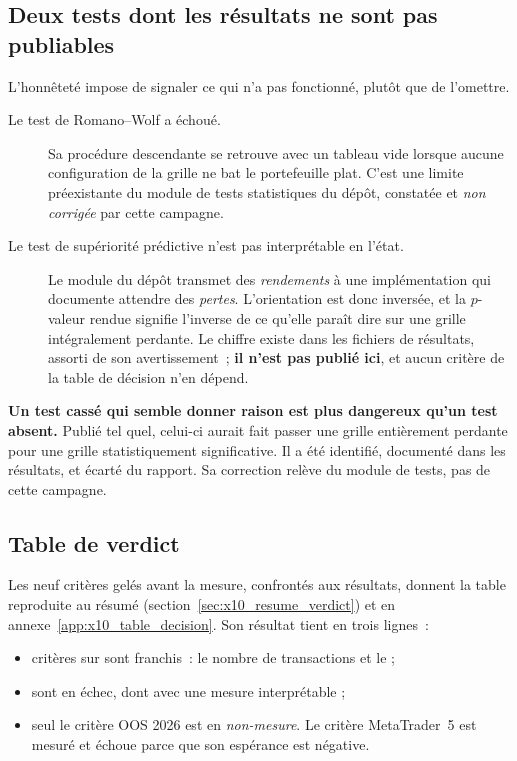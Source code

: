 \subsection{Deux tests dont les résultats ne sont pas publiables}

L'honnêteté impose de signaler ce qui n'a pas fonctionné, plutôt que de
l'omettre.

\begin{description}
  \item[Le test de Romano--Wolf a échoué.] Sa procédure descendante se
  retrouve avec un tableau vide lorsque aucune configuration de la grille ne
  bat le portefeuille plat. C'est une limite préexistante du module de tests
  statistiques du dépôt, constatée et \emph{non corrigée} par cette campagne.
  \item[Le test de supériorité prédictive n'est pas interprétable en
  l'état.] Le module du dépôt transmet des \emph{rendements} à une
  implémentation qui documente attendre des \emph{pertes}. L'orientation est
  donc inversée, et la $p$-valeur rendue signifie l'inverse de ce qu'elle
  paraît dire sur une grille intégralement perdante. Le chiffre existe dans
  les fichiers de résultats, assorti de son avertissement~; \textbf{il n'est
  pas publié ici}, et aucun critère de la table de décision n'en dépend.
\end{description}

\begin{insightbox}
\textbf{Un test cassé qui semble donner raison est plus dangereux qu'un test
absent.} Publié tel quel, celui-ci aurait fait passer une grille entièrement
perdante pour une grille statistiquement significative. Il a été identifié,
documenté dans les résultats, et écarté du rapport. Sa correction relève du
module de tests, pas de cette campagne.
\end{insightbox}

\subsection{Table de verdict}

Les neuf critères gelés avant la mesure, confrontés aux résultats, donnent la
table reproduite au résumé (section~\ref{sec:x10_resume_verdict}) et en
annexe~\ref{app:x10_table_decision}. Son résultat tient en trois lignes~:

\begin{itemize}
  \item \XTenCriteriaPassing{} critères sur \XTenCriteriaCount{} sont
  franchis~: le nombre de transactions et le  ;
  \item \XTenCriteriaFailing{} sont en échec, dont
  \XTenCriteriaFailingInterpretable{} avec une mesure interprétable ;
  \item seul le critère OOS 2026 est en \emph{non-mesure}. Le critère
  MetaTrader~5 est mesuré et échoue parce que son espérance est négative.
\end{itemize}

